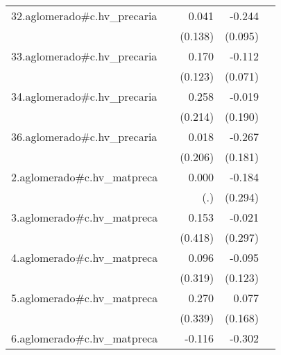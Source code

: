 {\begin{longtable}{l*{4}{D{.}{.}{-1}}}
\addlinespace
32.aglomerado#c.hv\_precaria&                     &       0.041         &      -0.244\sym{*}  &                     \\
            &                     &     (0.138)         &     (0.095)         &                     \\
\addlinespace
33.aglomerado#c.hv\_precaria&                     &       0.170         &      -0.112         &                     \\
            &                     &     (0.123)         &     (0.071)         &                     \\
\addlinespace
34.aglomerado#c.hv\_precaria&                     &       0.258         &      -0.019         &                     \\
            &                     &     (0.214)         &     (0.190)         &                     \\
\addlinespace
36.aglomerado#c.hv\_precaria&                     &       0.018         &      -0.267         &                     \\
            &                     &     (0.206)         &     (0.181)         &                     \\
\addlinespace
2.aglomerado#c.hv\_matpreca&                     &       0.000         &      -0.184         &                     \\
            &                     &         (.)         &     (0.294)         &                     \\
\addlinespace
3.aglomerado#c.hv\_matpreca&                     &       0.153         &      -0.021         &                     \\
            &                     &     (0.418)         &     (0.297)         &                     \\
\addlinespace
4.aglomerado#c.hv\_matpreca&                     &       0.096         &      -0.095         &                     \\
            &                     &     (0.319)         &     (0.123)         &                     \\
\addlinespace
5.aglomerado#c.hv\_matpreca&                     &       0.270         &       0.077         &                     \\
            &                     &     (0.339)         &     (0.168)         &                     \\
\addlinespace
6.aglomerado#c.hv\_matpreca&                     &      -0.116         &      -0.302         &                     \\

\end{longtable}}
